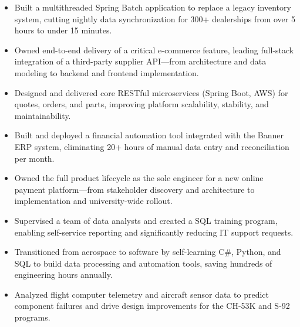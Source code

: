 \begin{itemize}
    \item Built a multithreaded Spring Batch application to replace a legacy inventory system, cutting nightly data synchronization for 300+ dealerships from over 5 hours to under 15 minutes.
    \item Owned end-to-end delivery of a critical e-commerce feature, leading full-stack integration of a third-party supplier API—from architecture and data modeling to backend and frontend implementation.
    \item Designed and delivered core RESTful microservices (Spring Boot, AWS) for quotes, orders, and parts, improving platform scalability, stability, and maintainability.
\end{itemize}
\vspace{\spacingBetweenJobs}

\begin{itemize}
    \item Built and deployed a financial automation tool integrated with the Banner ERP system, eliminating 20+ hours of manual data entry and reconciliation per month.
    \item Owned the full product lifecycle as the sole engineer for a new online payment platform—from stakeholder discovery and architecture to implementation and university-wide rollout.
    \item Supervised a team of data analysts and created a SQL training program, enabling self-service reporting and significantly reducing IT support requests.
\end{itemize}
\vspace{\spacingBetweenJobs}

\begin{itemize}
    \item Transitioned from aerospace to software by self-learning C\#, Python, and SQL to build data processing and automation tools, saving hundreds of engineering hours annually.
    \item Analyzed flight computer telemetry and aircraft sensor data to predict component failures and drive design improvements for the CH-53K and S-92 programs.
\end{itemize}
\vspace{\spacingBetweenJobs}

